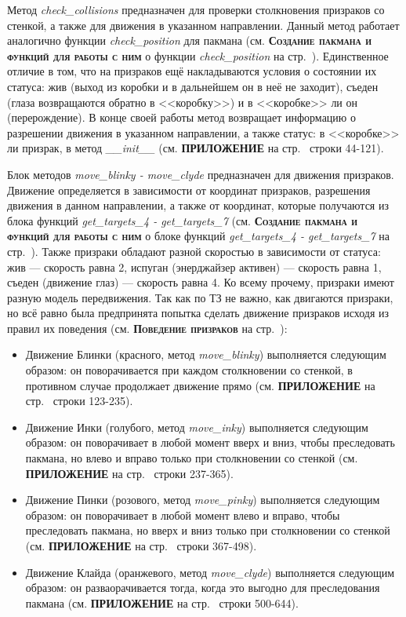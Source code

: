 Метод \textit{check\_collisions} предназначен для проверки столкновения призраков со стенкой, а также для движения в указанном направлении. Данный метод работает аналогично функции \textit{check\_position} для пакмана (см. \textbf{\textsc{Создание пакмана и функций для работы с ним}} о функции \textit{check\_position} на стр.~\pageref{subsec:ch02/sec01/sub05}). Единственное отличие в том, что на призраков ещё накладываются условия о состоянии их статуса: жив (выход из коробки и в дальнейшем он в неё не заходит), съеден (глаза возвращаются обратно в <<коробку>>) и в <<коробке>> ли он (перерождение). В конце своей работы метод возвращает информацию о разрешении движения в указанном направлении, а также статус: в <<коробке>> ли призрак, в метод \textit{\_\_init\_\_} (см. \textbf{\textsc{ПРИЛОЖЕНИЕ}} на стр.~\pageref{code:ghost} строки 44-121).

Блок методов \textit{move\_blinky - move\_clyde} предназначен для движения призраков. Движение определяется в зависимости от координат призраков, разрешения движения в данном направлении, а также от координат, которые получаются из блока функций \textit{get\_targets\_4 - get\_targets\_7} (см. \textbf{\textsc{Создание пакмана и функций для работы с ним}} о блоке функций \textit{get\_targets\_4 - get\_targets\_7} на стр.~\pageref{subsec:ch02/sec01/sub05}). Также призраки обладают разной скоростью в зависимости от статуса: жив --- скорость равна 2, испуган (энерджайзер активен) --- скорость равна 1, съеден (движение глаз) --- скорость равна 4. Ко всему прочему, призраки имеют разную модель передвижения. Так как по ТЗ не важно, как двигаются призраки, но всё равно была предпринята попытка сделать движение призраков исходя из правил их поведения (см. \textbf{\textsc{Поведение призраков}} на стр.~\pageref{subsec:ch01/sec04/subsec03}):
\begin{itemize}
	\item Движение Блинки (красного, метод \textit{move\_blinky}) выполняется следующим образом: он поворачивается при каждом столкновении со стенкой, в противном случае
	продолжает движение прямо (см. \textbf{\textsc{ПРИЛОЖЕНИЕ}} на стр.~\pageref{code:ghost} строки 123-235).
	\item Движение Инки (голубого, метод \textit{move\_inky}) выполняется следующим образом: он поворачивает в любой момент вверх и вниз, чтобы преследовать пакмана, но влево и вправо только при столкновении со стенкой (см. \textbf{\textsc{ПРИЛОЖЕНИЕ}} на стр.~\pageref{code:ghost} строки 237-365).
	\item Движение Пинки (розового, метод \textit{move\_pinky}) выполняется следующим образом: он поворачивает в любой момент влево и вправо, чтобы преследовать пакмана, но вверх и вниз только при столкновении со стенкой (см. \textbf{\textsc{ПРИЛОЖЕНИЕ}} на стр.~\pageref{code:ghost} строки 367-498).
	\item Движение Клайда (оранжевого, метод \textit{move\_clyde}) выполняется следующим образом: он разваорачивается тогда, когда это выгодно для преследования пакмана (см. \textbf{\textsc{ПРИЛОЖЕНИЕ}} на стр.~\pageref{code:ghost} строки 500-644).
\end{itemize}

